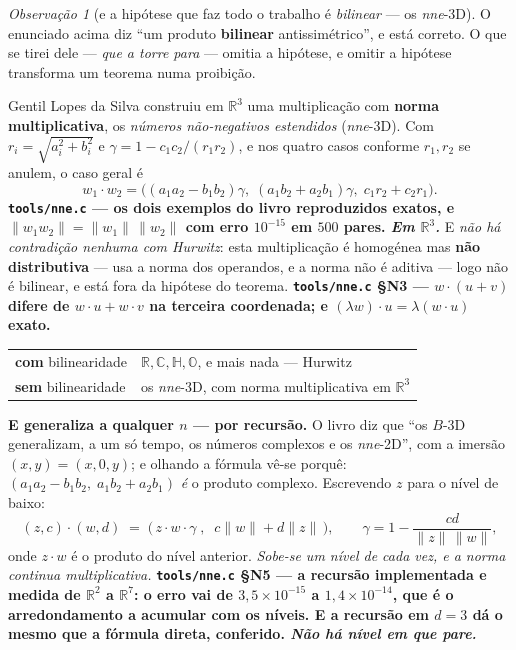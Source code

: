 \documentclass[11pt]{article}
\providecommand{\Oo}{\mathbb O}
\newcommand{\code}[1]{\texttt{\small #1}}
\newcommand{\R}{\mathbb R}
\newcommand{\C}{\mathbb C}
\newcommand{\Hq}{\mathbb H}
\theoremstyle{plain}
\theoremstyle{remark}
\newtheorem{obs}{Observação}
\providecommand{\medido}[1]{\textbf{#1}}
\begin{document}
\begin{obs}[e a hipótese que faz todo o trabalho é \emph{bilinear} --- os \emph{nne}-3D]
O enunciado acima diz ``um produto \textbf{bilinear} antissimétrico'', e está correto. O que se
tirei dele --- \emph{que a torre para} --- omitia a hipótese, e omitir a hipótese transforma um
teorema numa proibição.

Gentil Lopes da Silva construiu em $\R^3$ uma multiplicação com \textbf{norma multiplicativa}, os
\emph{números não-negativos estendidos} (\emph{nne}-3D). Com $r_i=\sqrt{a_i^2+b_i^2}$ e
$\gamma=1-c_1c_2/(r_1r_2)$, e nos quatro casos conforme $r_1,r_2$ se anulem, o caso geral é
\[
 w_1\cdot w_2 = \bigl((a_1a_2-b_1b_2)\gamma,\;(a_1b_2+a_2b_1)\gamma,\;c_1r_2+c_2r_1\bigr).
\]
\medido{\code{tools/nne.c} --- os dois exemplos do livro reproduzidos exatos, e
$\|w_1w_2\|=\|w_1\|\,\|w_2\|$ com erro $10^{-15}$ em $500$ pares. \emph{Em $\R^3$.}}
E \emph{não há contradição nenhuma com Hurwitz}: esta multiplicação é homogénea mas
\textbf{não distributiva} --- usa a norma dos operandos, e a norma não é aditiva --- logo não é
bilinear, e está fora da hipótese do teorema.
\medido{\code{tools/nne.c} §N3 --- $w\cdot(u+v)$ difere de $w\cdot u+w\cdot v$ na terceira
coordenada; e $(\lambda w)\cdot u=\lambda(w\cdot u)$ exato.}
\begin{center}
\begin{tabular}{ll}
\toprule
\textbf{com} bilinearidade & $\R,\C,\Hq,\Oo$, e mais nada --- Hurwitz \\
\textbf{sem} bilinearidade & os \emph{nne}-3D, com norma multiplicativa em $\R^3$ \\
\bottomrule
\end{tabular}
\end{center}
\textbf{E generaliza a qualquer $n$ --- por recursão.} O livro diz que ``os $B$-3D generalizam, a
um só tempo, os números complexos e os \emph{nne}-2D'', com a imersão $(x,y)=(x,0,y)$; e olhando a
fórmula vê-se porquê: $(a_1a_2-b_1b_2,\;a_1b_2+a_2b_1)$ \emph{é} o produto complexo. Escrevendo
$z$ para o nível de baixo:
\[
 (z,c)\cdot(w,d) \;=\; \bigl(\,z\cdot w\cdot\gamma\;,\;\; c\|w\| + d\|z\|\,\bigr),
 \qquad \gamma = 1-\frac{cd}{\|z\|\,\|w\|},
\]
onde $z\cdot w$ é o produto do nível anterior. \emph{Sobe-se um nível de cada vez, e a norma
continua multiplicativa.}
\medido{\code{tools/nne.c} §N5 --- a recursão implementada e medida de $\R^2$ a $\R^7$: o erro vai
de $3{,}5\times10^{-15}$ a $1{,}4\times10^{-14}$, que é o arredondamento a acumular com os níveis.
E a recursão em $d=3$ dá o mesmo que a fórmula direta, conferido. \emph{Não há nível em que pare.}}


\end{obs}
\end{document}
